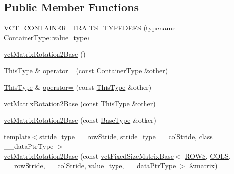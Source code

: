 \subsection*{Public Member Functions}
\begin{DoxyCompactItemize}
\item 
\hyperlink{classvct_matrix_rotation2_base_a53f93373826dfea7f2e7beb62a1a3072}{V\-C\-T\-\_\-\-C\-O\-N\-T\-A\-I\-N\-E\-R\-\_\-\-T\-R\-A\-I\-T\-S\-\_\-\-T\-Y\-P\-E\-D\-E\-F\-S} (typename Container\-Type\-::value\-\_\-type)
\item 
\hyperlink{classvct_matrix_rotation2_base_a6950e81d5174a508ec620833f22f94c2}{vct\-Matrix\-Rotation2\-Base} ()
\item 
\hyperlink{classvct_matrix_rotation2_base_a47ffeef2ddecede4b16bcc88fb432ff5}{This\-Type} \& \hyperlink{classvct_matrix_rotation2_base_a97e26b1d8cdc2115b5226131f8855257}{operator=} (const \hyperlink{classvct_matrix_rotation2_base_ace2b6ba4773b1688b757cec782686180}{Container\-Type} \&other)
\item 
\hyperlink{classvct_matrix_rotation2_base_a47ffeef2ddecede4b16bcc88fb432ff5}{This\-Type} \& \hyperlink{classvct_matrix_rotation2_base_a8a73afa863de9fe734e328c3a9c5f2a3}{operator=} (const \hyperlink{classvct_matrix_rotation2_base_a47ffeef2ddecede4b16bcc88fb432ff5}{This\-Type} \&other)
\item 
\hyperlink{classvct_matrix_rotation2_base_aa750cca07042d1c31d4845deb0ac86ad}{vct\-Matrix\-Rotation2\-Base} (const \hyperlink{classvct_matrix_rotation2_base_a47ffeef2ddecede4b16bcc88fb432ff5}{This\-Type} \&other)
\item 
\hyperlink{classvct_matrix_rotation2_base_a527f575ac195d968387cb5d59c64e39e}{vct\-Matrix\-Rotation2\-Base} (const \hyperlink{classvct_matrix_rotation2_base_a3ce93aa444c1fadbc26ed0d5582ad33a}{Base\-Type} \&other)
\item 
{\footnotesize template$<$stride\-\_\-type \-\_\-\-\_\-row\-Stride, stride\-\_\-type \-\_\-\-\_\-col\-Stride, class \-\_\-\-\_\-data\-Ptr\-Type $>$ }\\\hyperlink{classvct_matrix_rotation2_base_a42cc8718e18541d2dce30213fd62119e}{vct\-Matrix\-Rotation2\-Base} (const \hyperlink{classvct_fixed_size_matrix_base}{vct\-Fixed\-Size\-Matrix\-Base}$<$ \hyperlink{classvct_matrix_rotation2_base_aee21d1136c8b273c716774ceb24ea31bad80015187d3670804554f4bd9cec3822}{R\-O\-W\-S}, \hyperlink{classvct_matrix_rotation2_base_aee21d1136c8b273c716774ceb24ea31babf5d0d692c30b7a19cc0c63d2bcc2113}{C\-O\-L\-S}, \-\_\-\-\_\-row\-Stride, \-\_\-\-\_\-col\-Stride, value\-\_\-type, \-\_\-\-\_\-data\-Ptr\-Type $>$ \&matrix)

\end{DoxyCompactItemize}

